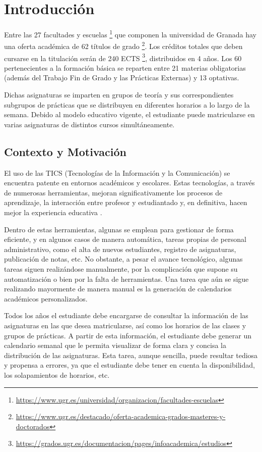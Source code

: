\chapter{Introducción}
Entre las 27 facultades y escuelas \footnote[1]{\url{https://www.ugr.es/universidad/organizacion/facultades-escuelas}} que componen la universidad de Granada hay una oferta académica de 62 títulos de grado \footnote[2]{\url{https://www.ugr.es/destacado/oferta-academica-grados-masteres-y-doctorados}}. Los créditos totales que deben cursarse en la titulación serán de 240 ECTS \footnote[3]{\url{https://grados.ugr.es/documentacion/pages/infoacademica/estudios}}, distribuidos en 4 años. Los 60 pertenecientes a la formación básica se reparten entre 21 materias obligatorias (además del Trabajo Fin de Grado y las Prácticas Externas) y 13 optativas.\newline

Dichas asignaturas se imparten en grupos de teoría y sus correspondientes subgrupos de prácticas que se distribuyen en diferentes horarios a lo largo de la semana. Debido al modelo educativo vigente, el estudiante puede matricularse en varias asignaturas de distintos cursos simultáneamente. 

\section{Contexto y Motivación}
El uso de las TICS (Tecnologías de la Información y la Comunicación) se encuentra patente en entornos académicos y escolares. Estas tecnologías, a través de numerosas herramientas, mejoran significativamente los procesos de aprendizaje, la interacción entre profesor y estudiantado y, en definitiva, hacen mejor la experiencia educativa \cite{Flores-Alarcia2012} \cite{Paladines} \cite{TICenLaEducacion}.\newline

Dentro de estas herramientas, algunas se emplean para gestionar de forma eficiente, y en algunos casos de manera automática, tareas propias de personal administrativo, como el alta de nuevos estudiantes, registro de asignaturas, publicación de notas, etc. No obstante, a pesar el avance tecnológico, algunas tareas siguen realizándose manualmente, por la complicación que supone su automatización o bien por la falta de herramientas. Una tarea que aún se sigue realizando mayormente de manera manual es la generación de calendarios académicos personalizados.\newline

Todos los años el estudiante debe encargarse de consultar la información de las asignaturas en las que desea matricularse, así como los horarios de las clases y grupos de prácticas. A partir de esta información, el estudiante debe generar un calendario semanal que le permita visualizar de forma clara y concisa la distribución de las asignaturas. Esta tarea, aunque sencilla, puede resultar tediosa y propensa a errores, ya que el estudiante debe tener en cuenta la disponibilidad, los solapamientos de horarios, etc.\newline

